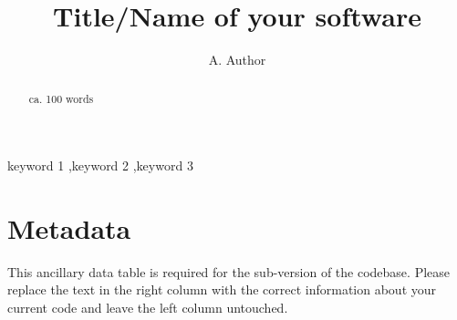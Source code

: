 \documentclass[preprint,12pt, a4paper]{elsarticle}
\begin{document}
\begin{frontmatter}



\title{Title/Name of your software}


\author{A. Author}

\address{Your institute, some address}

\begin{abstract}
ca. 100 words

\end{abstract}

\begin{keyword}
keyword 1 \sep keyword 2 \sep keyword 3
\end{keyword}

\end{frontmatter}


\section*{Metadata}
\label{}

This ancillary data table is required for the sub-version of the codebase.
Please replace the text in the right column with the correct information
about your current code and leave the left column untouched.
\end{document}
